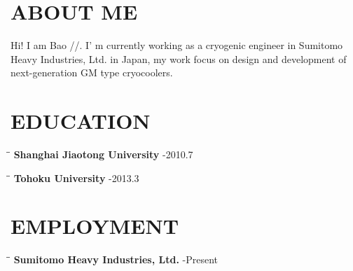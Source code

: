 \documentclass[12pt,A4]{res}
\begin{document}
 


\address{\textbf PRESENT ADDRESS\\Yato-cho 2chome 2-9 Room 510\\Nishitokyo-city,Tokyo\\Japan, Postcode: 188-0001}
\address{\textbf{CONTACT INFO} \\ Email: houkensjtu@gmail.com \\ Mobile: +81-090-9427-1113 \\  Phone: +81-042-468-4474}
                                  
\begin{resume}

\section{ABOUT ME}          
Hi! I am Bao //. I' m currently working as a cryogenic engineer in Sumitomo Heavy Industries, Ltd. in Japan,
 my work focus on design and development of next-generation GM type cryocoolers.


\section{EDUCATION}      
    \vspace{-0.1in}	    
    \begin{tabbing}
    \hspace{2.2in}\= \hspace{2.6in}\= \kill %
    {\bf Shanghai Jiaotong University} \>  -2010.7
   \end{tabbing}\vspace{-20pt}      %
   
   \begin{tabbing}
    \hspace{2.2in}\= \hspace{2.6in}\= \kill %
    {\bf Tohoku University} \>  -2013.3
   \end{tabbing}\vspace{-20pt}      %

\section{EMPLOYMENT}
    \vspace{-0.1in}	    
    \begin{tabbing}
    \hspace{2.2in}\= \hspace{2.6in}\= \kill %
    {\bf Sumitomo Heavy Industries, Ltd.} \>  -Present
   \end{tabbing}\vspace{-20pt}      %
   

\end{resume}
\end{document}
